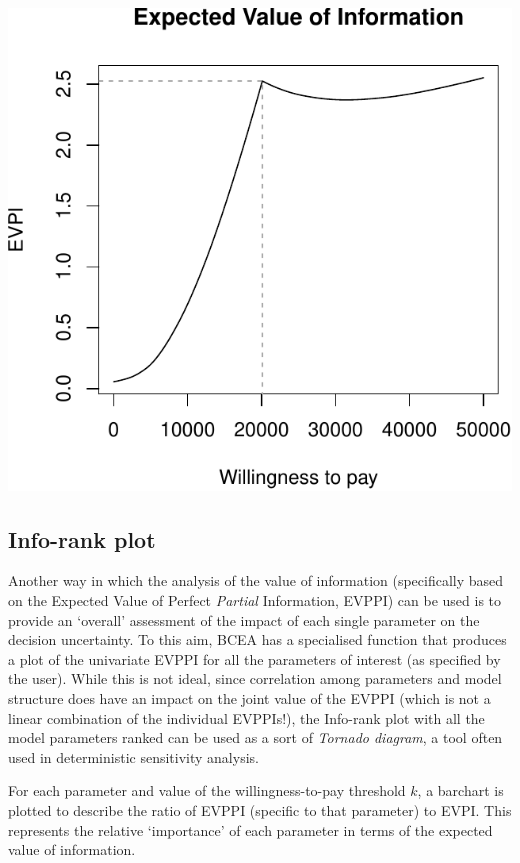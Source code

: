 \documentclass[]{article}
\begin{document}
\begin{center}\includegraphics{report_files/figure-latex/unnamed-chunk-8-1} \end{center}

\hypertarget{info-rank-plot}{%
\subsection{Info-rank plot}\label{info-rank-plot}}

Another way in which the analysis of the value of information
(specifically based on the Expected Value of Perfect \emph{Partial}
Information, EVPPI) can be used is to provide an `overall' assessment of
the impact of each single parameter on the decision uncertainty. To this
aim, BCEA has a specialised function that produces a plot of the
univariate EVPPI for all the parameters of interest (as specified by the
user). While this is not ideal, since correlation among parameters and
model structure does have an impact on the joint value of the EVPPI
(which is not a linear combination of the individual EVPPIs!), the
Info-rank plot with all the model parameters ranked can be used as a
sort of \emph{Tornado diagram}, a tool often used in deterministic
sensitivity analysis.

For each parameter and value of the willingness-to-pay threshold \(k\),
a barchart is plotted to describe the ratio of EVPPI (specific to that
parameter) to EVPI. This represents the relative `importance' of each
parameter in terms of the expected value of information.
\end{document}
